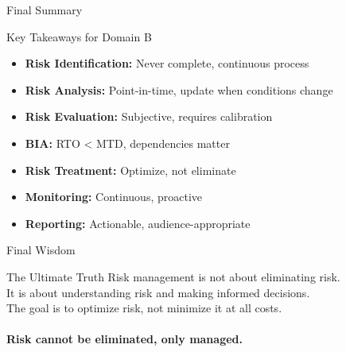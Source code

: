 \documentclass{beamer}
\begin{document}
																													\begin{frame}{Final Summary}
																														\begin{block}{Key Takeaways for Domain B}
																															\begin{itemize}
																																\item \textbf{Risk Identification:} Never complete, continuous process
																																\item \textbf{Risk Analysis:} Point-in-time, update when conditions change
																																\item \textbf{Risk Evaluation:} Subjective, requires calibration
																																\item \textbf{BIA:} RTO < MTD, dependencies matter
																																\item \textbf{Risk Treatment:} Optimize, not eliminate
																																\item \textbf{Monitoring:} Continuous, proactive
																																\item \textbf{Reporting:} Actionable, audience-appropriate
																															\end{itemize}
																														\end{block}
																													\end{frame}
																													
																													\begin{frame}{Final Wisdom}
																														\begin{alertblock}{The Ultimate Truth}
																															Risk management is not about eliminating risk.\\
																															It is about understanding risk and making informed decisions.\\
																															The goal is to optimize risk, not minimize it at all costs.\\
																															\\
																															\textbf{Risk cannot be eliminated, only managed.}
																														\end{alertblock}
																													\end{frame}
																													
\end{document}
